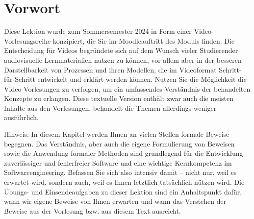 \cleardoublepage
\chapter*{Vorwort}

Diese Lektion wurde zum Sommersemester 2024 in Form einer Video-Vorlesungs\-reihe konzipiert, die Sie im Moodleauftritt des Moduls finden. Die Entscheidung für Videos begründete sich auf dem Wunsch vieler Studierender audiovisuelle Lernmaterialien nutzen zu können, vor allem aber in der besseren Darstellbarkeit von Prozessen und ihren Modellen, die im Videoformat Schritt-für-Schritt entwickelt und erklärt werden können. Nutzen Sie die Möglichkeit die Video-Vorlesungen zu verfolgen, um ein umfassendes Verständnis der behandelten Konzepte zu erlangen. Diese textuelle Version enthält zwar auch die meisten Inhalte aus den Vorlesungen, behandelt die Themen allerdings weniger ausführlich.

Hinweis: In diesem Kapitel werden Ihnen an vielen Stellen formale Beweise begegnen. Das Verständnis, aber auch die eigene Formulierung von Beweisen sowie die Anwendung formaler Methoden sind grundlegend für die Entwicklung zuverlässiger und fehlerfreier Software und eine wichtige Kernkompetenz im Softwareengineering. Befassen Sie sich also intensiv damit – nicht nur, weil es erwartet wird, sondern auch, weil es Ihnen letztlich tatsächlich nützen wird. Die Übungs- und Einsendeaufgaben zu dieser Lektion sind ein Anhaltspunkt dafür, wann wir eigene Beweise von Ihnen erwarten und wann das Verstehen der Beweise aus der Vorlesung bzw. aus diesem Text ausreicht.